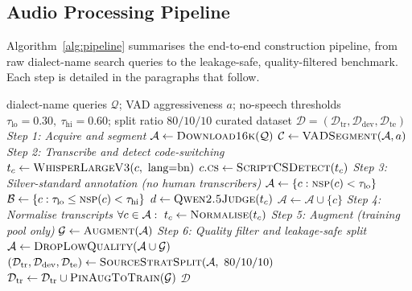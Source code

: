 \subsection{Audio Processing Pipeline}

Algorithm~\ref{alg:pipeline} summarises the end-to-end construction pipeline,
from raw dialect-name search queries to the leakage-safe, quality-filtered
benchmark. Each step is detailed in the paragraphs that follow.

\begin{algorithm}[t]
\caption{BanglaMix: From Raw Dialectal Audio to a Curated CS-ASR Benchmark}
\label{alg:pipeline}
\begin{algorithmic}[1]
\Require dialect-name queries $\mathcal{Q}$; VAD aggressiveness $a$;
no-speech thresholds $\tau_{\text{lo}}{=}0.30,\ \tau_{\text{hi}}{=}0.60$; split ratio $80/10/10$
\Ensure curated dataset $\mathcal{D}=(\mathcal{D}_{\text{tr}},\mathcal{D}_{\text{dev}},\mathcal{D}_{\text{te}})$
\Statex \textit{Step 1: Acquire and segment}
\State $\mathcal{A} \gets \textsc{Download16k}(\mathcal{Q})$ 
\State $\mathcal{C} \gets \textsc{VADSegment}(\mathcal{A}, a)$ 
\Statex \textit{Step 2: Transcribe and detect code-switching}
    \State $t_c \gets \textsc{WhisperLargeV3}(c,\ \text{lang}{=}\text{bn})$
    \State $c.\textsc{cs} \gets \textsc{ScriptCSDetect}(t_c)$ 
\EndFor
\Statex \textit{Step 3: Silver-standard annotation (no human transcribers)}
\State $\mathcal{A} \gets \{c : \textsc{nsp}(c) < \tau_{\text{lo}}\}$ 
\State $\mathcal{B} \gets \{c : \tau_{\text{lo}} \le \textsc{nsp}(c) < \tau_{\text{hi}}\}$ 
    \State $d \gets \textsc{Qwen2.5Judge}(t_c)$ 
        \State $\mathcal{A} \gets \mathcal{A} \cup \{c\}$ 
    \EndIf
\EndFor
\Statex \textit{Step 4: Normalise transcripts}
\State $\forall c \in \mathcal{A}:\ t_c \gets \textsc{Normalise}(t_c)$ 
\Statex \textit{Step 5: Augment (training pool only)}
\State $\mathcal{G} \gets \textsc{Augment}(\mathcal{A})$ 
\Statex \textit{Step 6: Quality filter and leakage-safe split}
\State $\mathcal{A} \gets \textsc{DropLowQuality}(\mathcal{A} \cup \mathcal{G})$ 
\State $(\mathcal{D}_{\text{tr}},\mathcal{D}_{\text{dev}},\mathcal{D}_{\text{te}}) \gets \textsc{SourceStratSplit}(\mathcal{A},\ 80/10/10)$ 
\State $\mathcal{D}_{\text{tr}} \gets \mathcal{D}_{\text{tr}} \cup \textsc{PinAugToTrain}(\mathcal{G})$ 
\State \Return $\mathcal{D}$ 
\end{algorithmic}
\end{algorithm}

